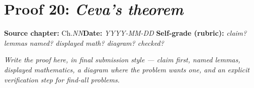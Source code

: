 \documentclass[11pt]{article}
\begin{document}
\section*{Proof 20: \emph{Ceva's theorem}}
\textbf{Source chapter:} Ch.\emph{NN}\quad \textbf{Date:} \emph{YYYY-MM-DD}\quad
\textbf{Self-grade (rubric):} \emph{claim? lemmas named? displayed math? diagram? checked?}
\medskip

\emph{Write the proof here, in final submission style — claim first, named lemmas,
displayed mathematics, a diagram where the problem wants one, and an explicit
verification step for find-all problems.}
\end{document}
